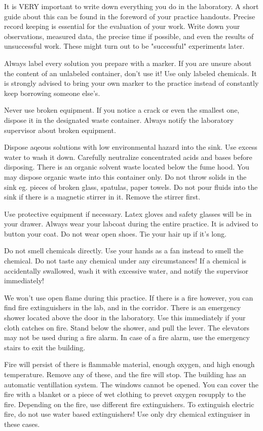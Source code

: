 It is VERY important to write down everything you do in the laboratory. A short guide about this can be found in the foreword of your practice handouts. Precise record keeping is essential for the evaluation of your work. Write down your observations, measured data, the precise time if possible, and even the results of unsuccessful work. These might turn out to be "successful" experiments later.

Always label every solution you prepare with a marker. If you are unsure about the content of an unlabeled container, don't use it! Use only labeled chemicals. It is strongly advised to bring your own marker to the practice instead of constantly keep borrowing someone else's.

Never use broken equipment. If you notice a crack or even the smallest one, dispose it in the designated waste container. Always notify the laboratory supervisor about broken equipment.

Dispose aqeous solutions with low environmental hazard into the sink. Use excess water to wash it down. Carefully neutralize concentrated acids and bases before disposing. There is an organic solvent waste located below the fume hood. You may dispose organic waste into this container only. Do not throw solids in the sink eg. pieces of broken glass, spatulas, paper towels. Do not pour fluids into the sink if there is a magnetic stirrer in it. Remove the stirrer first.

Use protective equipment if necessary. Latex gloves and safety glasses will be in your drawer. Always wear your labcoat during the entire practice. It is advised to button your coat. Do not wear open shoes. Tie your hair up if it's long.

Do not smell chemicals directly. Use your hands as a fan instead to smell the chemical. Do not taste any chemical under any circumstances! If a chemical is accidentally swallowed, wash it with excessive water, and notify the supervisor immediately!

We won't use open flame during this practice. If there is a fire however, you can find fire extinguishers in the lab, and in the corridor. There is an emergency shower located above the door in the laboratory. Use this immediately if your cloth catches on fire. Stand below the shower, and pull the lever. The elevators may not be used during a fire alarm. In case of a fire alarm, use the emergency stairs to exit the building.

Fire will persist of there is flammable material, enough oxygen, and high enough temperature. Remove any of these, and the fire will stop. The building has an automatic ventillation system. The windows cannot be opened. You can cover the fire with a blanket or a piece of wet clothing to prevet oxygen resupply to the fire. Depending on the fire, use different fire extinguishers. To extinguish electric fire, do not use water based extinguishers! Use only dry chemical extinguiser in these cases.

